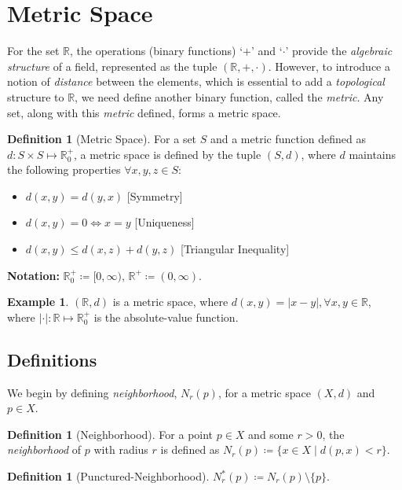 \documentclass{report}
\theoremstyle{plain}
\theoremstyle{definition}
\newtheorem{definition}[theorem]{Definition} %
\newtheorem{example}[theorem]{Example} %
\begin{document}
\section{Metric Space}
For the set $\mathbb{R}$, the operations (binary functions) `$+$' and `$\cdot$' provide the \emph{algebraic structure} of a field, represented as the tuple $(\mathbb{R}, +, \cdot)$. However, to introduce a notion of \emph{distance} between the elements, which is essential to add a \emph{topological} structure to $\mathbb{R}$, we need define another binary function, called the \emph{metric}. Any set, along with this \emph{metric} defined, forms a metric space.
\begin{definition}[Metric Space]
For a set $S$ and a metric function defined as $d:S\times S\mapsto\mathbb{R}_0^+$, a metric space is defined by the tuple $(S,d)$, where $d$ maintains the following properties $\forall x, y, z\in S$:
\begin{itemize}
\item[(a)] $d(x,y)=d(y,x)$ [Symmetry]
\item[(b)] $d(x,y)=0\Leftrightarrow x=y$ [Uniqueness]
\item[(c)] $d(x,y)\le d(x,z)+d(y,z)$ [Triangular Inequality]
\end{itemize}
\end{definition}
\noindent\textbf{Notation:} $\mathbb{R}_0^+\coloneqq[0,\infty)$, $\mathbb{R}^+\coloneqq(0,\infty)$.
\begin{example}
\noindent $(\mathbb{R},d)$ is a metric space, where $d(x,y)=|x-y|, \forall x,y\in\mathbb{R}$, where $|\cdot|:\mathbb{R}\mapsto\mathbb{R}_0^+$ is the absolute-value function.
\end{example}
\subsection{Definitions}
We begin by defining \emph{neighborhood}, $N_r(p)$, for a metric space $(X, d)$ and $p\in X$.
\begin{definition}[Neighborhood]
For a point $p\in X$ and some $r>0$, the \emph{neighborhood} of $p$ with radius $r$ is defined as $N_r(p)\coloneqq\{x\in X \mid d(p,x)<r\}$.
\end{definition}
\begin{definition}[Punctured-Neighborhood]
$N^*_r(p)\coloneqq N_r(p)\setminus \{p\}$.
\end{definition}
\end{document}
